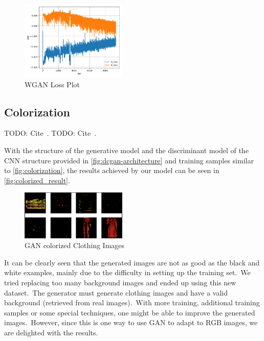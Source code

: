 \documentclass[conference]{IEEEtran}
\begin{document}
    \begin{figure}
        \caption{WGAN Loss Plot}
        \label{fig:loss-plot-wgan}
        \includegraphics[width=0.45\textwidth]{WGAN_loss.png}
        \centering
    \end{figure}

    \subsection{Colorization}\label{subsec:results-colorization}

    TODO: Cite~\cite{e-in-style}.
    TODO: Cite~\cite{pytorch-generative-model-collections}.

    With the structure of the generative model and the discriminant model of the CNN structure provided in \autoref{fig:dcgan-architecture} and training samples similar to \autoref{fig:colorization}, the results achieved by our model can be seen in \autoref{fig:colorized_result}.

    \begin{figure}
        \caption{GAN colorized Clothing Images}
        \label{fig:colorized_result}
        \includegraphics[width=0.45\textwidth]{learned_result.png}
        \centering
    \end{figure}

    It can be clearly seen that the generated images are not as good as the black and white examples, mainly due to the difficulty in setting up the training set.\ We tried replacing too many background images and ended up using this new dataset.\ The generator must generate clothing images and have a valid background (retrieved from real images).\ With more training, additional training samples or some special techniques, one might be able to improve the generated images.\ However, since this is one way to use GAN to adapt to RGB images, we are delighted with the results.
\end{document}
